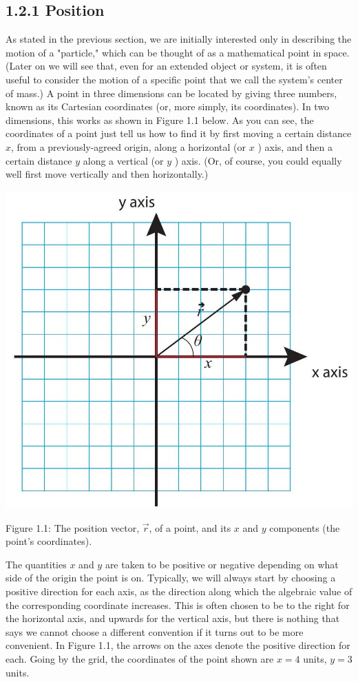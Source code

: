 \documentclass[10pt]{article}
\begin{document}
\subsection*{1.2.1 Position}
As stated in the previous section, we are initially interested only in describing the motion of a "particle," which can be thought of as a mathematical point in space. (Later on we will see that, even for an extended object or system, it is often useful to consider the motion of a specific point that we call the system's center of mass.) A point in three dimensions can be located by giving three numbers, known as its Cartesian coordinates (or, more simply, its coordinates). In two dimensions, this works as shown in Figure 1.1 below. As you can see, the coordinates of a point just tell us how to find it by first moving a certain distance $x$, from a previously-agreed origin, along a horizontal (or $x$ ) axis, and then a certain distance $y$ along a vertical (or $y$ ) axis. (Or, of course, you could equally well first move vertically and then horizontally.)

\begin{center}
\includegraphics[max width=\textwidth]{2024_09_14_9969b06773f10b6936e8g-022}
\end{center}

Figure 1.1: The position vector, $\vec{r}$, of a point, and its $x$ and $y$ components (the point's coordinates).

The quantities $x$ and $y$ are taken to be positive or negative depending on what side of the origin the point is on. Typically, we will always start by choosing a positive direction for each axis, as the direction along which the algebraic value of the corresponding coordinate increases. This is often chosen to be to the right for the horizontal axis, and upwards for the vertical axis, but there is nothing that says we cannot choose a different convention if it turns out to be more convenient. In Figure 1.1, the arrows on the axes denote the positive direction for each. Going by the grid, the coordinates of the point shown are $x=4$ units, $y=3$ units.
\end{document}
